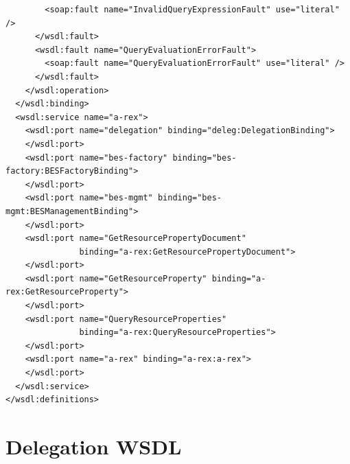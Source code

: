 \documentclass{article}                            %
\begin{document}
\begin{footnotesize}
\begin{verbatim}
        <soap:fault name="InvalidQueryExpressionFault" use="literal" />
      </wsdl:fault>
      <wsdl:fault name="QueryEvaluationErrorFault">
        <soap:fault name="QueryEvaluationErrorFault" use="literal" />
      </wsdl:fault>
    </wsdl:operation>
  </wsdl:binding>
  <wsdl:service name="a-rex">
    <wsdl:port name="delegation" binding="deleg:DelegationBinding">
    </wsdl:port>
    <wsdl:port name="bes-factory" binding="bes-factory:BESFactoryBinding">
    </wsdl:port>
    <wsdl:port name="bes-mgmt" binding="bes-mgmt:BESManagementBinding">
    </wsdl:port>
    <wsdl:port name="GetResourcePropertyDocument"
               binding="a-rex:GetResourcePropertyDocument">
    </wsdl:port>
    <wsdl:port name="GetResourceProperty" binding="a-rex:GetResourceProperty">
    </wsdl:port>
    <wsdl:port name="QueryResourceProperties"
               binding="a-rex:QueryResourceProperties">
    </wsdl:port>
    <wsdl:port name="a-rex" binding="a-rex:a-rex">
    </wsdl:port>
  </wsdl:service>
</wsdl:definitions>
\end{verbatim}
\end{footnotesize}

\section{Delegation WSDL\label{annex:delegation-wsdl}}
\end{document}
